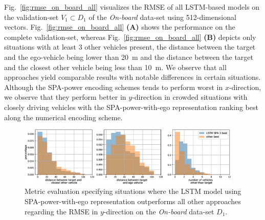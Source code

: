 Fig.~\ref{fig:rmse_on_board_all} visualizes the \ac{RMSE} of all \ac{LSTM}-based models on the validation-set $V_1 \subset D_1$ of the \emph{On-board} data-set using \num{512}-dimensional vectors.
Fig.~\ref{fig:rmse_on_board_all} \textbf{(A)} shows the performance on the complete validation-set, whereas Fig.~\ref{fig:rmse_on_board_all} \textbf{(B)} depicts only situations with at least \num{3} other vehicles present, the distance between the target and the ego-vehicle being lower than \SI{20}{\meter} and the distance between the target and the closest other vehicle being less than \SI{10}{\meter}.
We observe that all approaches yield comparable results with notable differences in certain situations.
Although the \ac{SPA}-power encoding schemes tends to perform worst in $x$-direction, we observe that they perform better in $y$-direction in crowded situations with closely driving vehicles with the \ac{SPA}-power-with-ego representation ranking best along the numerical encoding scheme.

\begin{figure}[t!]
  \centering
  \includegraphics[width=0.95\textwidth]{imgs/histogram_on_board_revised.eps}
  \caption{Metric evaluation specifying situations where the \ac{LSTM} model using \ac{SPA}-power-with-ego representation outperforms all other approaches regarding the \acs{RMSE} in $y$-direction on the \emph{On-board} data-set $D_1$.}\label{fig:histograms_on_board}
\end{figure}

